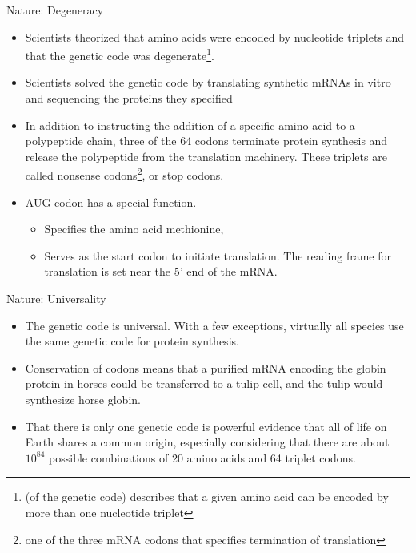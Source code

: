 \documentclass[11pt,dvipsnames,ignorenonframetext,aspectratio=169]{beamer}
\providecommand{\tightlist}{%
  \setlength{\itemsep}{0pt}\setlength{\parskip}{0pt}}
\begin{document}
\begin{frame}{Nature: Degeneracy}
\protect\hypertarget{nature-degeneracy}{}
\begin{itemize}
\tightlist
\item
  Scientists theorized that amino acids were encoded by nucleotide
  triplets and that the genetic code was
  degenerate\footnote[frame]{(of the genetic code) describes that a given amino acid can be encoded by more than one nucleotide triplet}.
\item
  Scientists solved the genetic code by translating synthetic mRNAs in
  vitro and sequencing the proteins they specified
\item
  In addition to instructing the addition of a specific amino acid to a
  polypeptide chain, three of the 64 codons terminate protein synthesis
  and release the polypeptide from the translation machinery. These
  triplets are called nonsense
  codons\footnote[frame]{one of the three mRNA codons that specifies termination of translation},
  or stop codons.
\item
  AUG codon has a special function.

  \begin{itemize}
  \tightlist
  \item
    Specifies the amino acid methionine,
  \item
    Serves as the start codon to initiate translation. The reading frame
    for translation is set near the 5' end of the mRNA.
  \end{itemize}
\end{itemize}
\end{frame}

\begin{frame}{Nature: Universality}
\protect\hypertarget{nature-universality}{}
\begin{itemize}
\tightlist
\item
  The genetic code is universal. With a few exceptions, virtually all
  species use the same genetic code for protein synthesis.
\item
  Conservation of codons means that a purified mRNA encoding the globin
  protein in horses could be transferred to a tulip cell, and the tulip
  would synthesize horse globin.
\item
  That there is only one genetic code is powerful evidence that all of
  life on Earth shares a common origin, especially considering that
  there are about \(10^{84}\) possible combinations of 20 amino acids
  and 64 triplet codons.
\end{itemize}
\end{frame}
\end{document}
